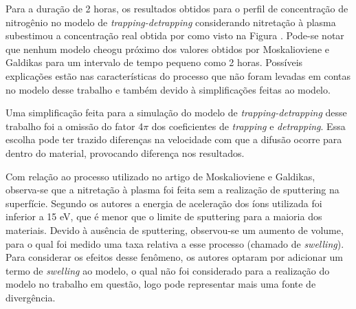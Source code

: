 

Para a duração de 2 horas, os resultados obtidos para o perfil de concentração de nitrogênio no modelo de \textit{trapping-detrapping} considerando nitretação à plasma subestimou a concentração real obtida por \cite{moskalioviene2011modeling} como visto na Figura . Pode-se notar que nenhum modelo cheogu próximo dos valores obtidos por Moskalioviene e Galdikas para um intervalo de tempo pequeno como 2 horas. Possíveis explicações estão nas características do processo que não foram levadas em contas no modelo desse trabalho e também devido à simplificações feitas ao modelo.

Uma simplificação feita para a simulação do modelo de \textit{trapping-detrapping} desse trabalho foi a omissão do fator 4$\pi$ dos coeficientes de \textit{trapping} e  \textit{detrapping}. Essa escolha pode ter trazido diferenças na velocidade com que a difusão ocorre para dentro do material, provocando diferença nos resultados.

Com relação ao processo utilizado no artigo de Moskalioviene e Galdikas, observa-se que a nitretação à plasma foi feita sem a realização de sputtering na superfície. Segundo os autores a energia de aceleração dos íons utilizada foi inferior a 15 eV, que é menor que o limite de sputtering para a maioria dos materiais. Devido à ausência de sputtering, observou-se um aumento de volume, para o qual foi medido uma taxa relativa a esse processo (chamado de \textit{swelling}). Para considerar os efeitos desse fenômeno, os autores optaram por adicionar um termo de \textit{swelling} ao modelo, o qual não foi considerado para a realização do modelo no trabalho em questão, logo pode representar mais uma fonte de divergência.